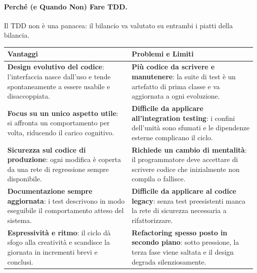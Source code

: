 \documentclass[12pt]{extarticle}
\begin{document}
\paragraph{Perché (e Quando Non) Fare TDD.}
Il TDD non è una panacea: il bilancio va valutato su entrambi i piatti della bilancia.
\begin{center}
\small
\begin{tabular}{p{7cm}p{7cm}}
    \toprule
    \textbf{Vantaggi} & \textbf{Problemi e Limiti} \\
    \midrule
    \textbf{Design evolutivo del codice}: l'interfaccia nasce dall'uso e tende spontaneamente a essere usabile e disaccoppiata. & \textbf{Più codice da scrivere e manutenere}: la suite di test è un artefatto di prima classe e va aggiornata a ogni evoluzione. \\
    \addlinespace
    \textbf{Focus su un unico aspetto utile}: si affronta un comportamento per volta, riducendo il carico cognitivo. & \textbf{Difficile da applicare all'integration testing}: i confini dell'unità sono sfumati e le dipendenze esterne complicano il ciclo. \\
    \addlinespace
    \textbf{Sicurezza sul codice di produzione}: ogni modifica è coperta da una rete di regressione sempre disponibile. & \textbf{Richiede un cambio di mentalità}: il programmatore deve accettare di scrivere codice che inizialmente non compila o fallisce. \\
    \addlinespace
    \textbf{Documentazione sempre aggiornata}: i test descrivono in modo eseguibile il comportamento atteso del sistema. & \textbf{Difficile da applicare al codice legacy}: senza test preesistenti manca la rete di sicurezza necessaria a rifattorizzare. \\
    \addlinespace
    \textbf{Espressività e ritmo}: il ciclo dà sfogo alla creatività e scandisce la giornata in incrementi brevi e conclusi. & \textbf{Refactoring spesso posto in secondo piano}: sotto pressione, la terza fase viene saltata e il design degrada silenziosamente. \\
    \bottomrule
\end{tabular}
\end{center}
\end{document}
